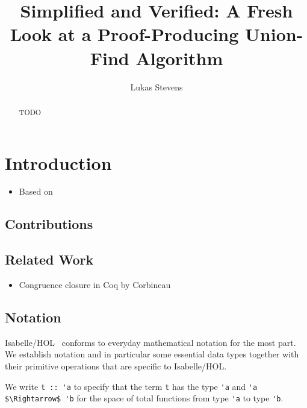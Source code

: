 \documentclass[
  sigplan,
  10pt,
  anonymous,
  review,
  ]{acmart}
\begin{document}

\setcounter{tocdepth}{1}

\title{Simplified and Verified: A Fresh Look at a Proof-Producing Union-Find Algorithm}
\author{Lukas Stevens}

\begin{abstract}
  TODO
\end{abstract}

\maketitle

\listoftodos{}

\section{Introduction}
\begin{itemize}
  \item Based on \cite{congcl_proofs}
\end{itemize}
\subsection{Contributions}

\subsection{Related Work}
\begin{itemize}
  \item Congruence closure in Coq by Corbineau
\end{itemize}


\subsection{Notation}
Isabelle/HOL~\cite{isabelle} conforms to everyday mathematical notation for the most part.
We establish notation and in particular some essential data types together with their primitive operations that are specific to Isabelle/HOL.

We write \lstinline!t :: 'a! to specify that the term \lstinline!t! has the type \lstinline!'a! and \lstinline!'a $\Rightarrow$ 'b! for the space of total functions from type \lstinline!'a! to type \lstinline!'b!.
\end{document}
